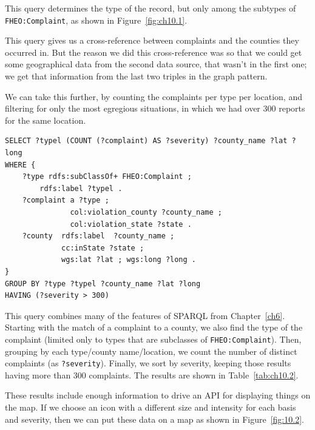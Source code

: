This query determines the type of the record, but only among the subtypes
of \texttt{FHEO:Complaint}, as shown in Figure~\ref{fig:ch10.1}.

This query gives us a cross-reference between complaints and the
counties they occurred in. But the reason we did this cross-reference
was so that we could get some geographical data from the second
data source, that wasn't in the first one; we get that information from
the last two triples in the graph pattern.

We can take this further, by counting the complaints per type per location, 
and filtering for only the most egregious situations, in which we had 
over 300 reports for the same location.  

\begin{lstlisting}
SELECT ?typel (COUNT (?complaint) AS ?severity) ?county_name ?lat ?long
WHERE {    
    ?type rdfs:subClassOf+ FHEO:Complaint ;
        rdfs:label ?typel .
    ?complaint a ?type ;
               col:violation_county ?county_name ;
               col:violation_state ?state .
    ?county  rdfs:label  ?county_name ;
             cc:inState ?state ;
             wgs:lat ?lat ; wgs:long ?long .
}
GROUP BY ?type ?typel ?county_name ?lat ?long
HAVING (?severity > 300)
\end{lstlisting}

This query combines many of the features of SPARQL from Chapter~\ref{ch6}.
Starting with the match of a complaint to a county, we also find the
type of the complaint (limited only to types that are subclasses of
\texttt{FHEO:Complaint}). Then, grouping by each type/county name/location, we count the
number of distinct complaints (as \texttt{?severity}). Finally, we sort by
severity, keeping those results having more than 300 complaints. The
results are shown in Table~\ref{tab:ch10.2}.

These results include enough information to drive an API for displaying
things on the map. If we choose an icon with a different size and
intensity for each basis and severity, then we can put these data on a
map as shown in Figure~\ref{fig:10.2}.

